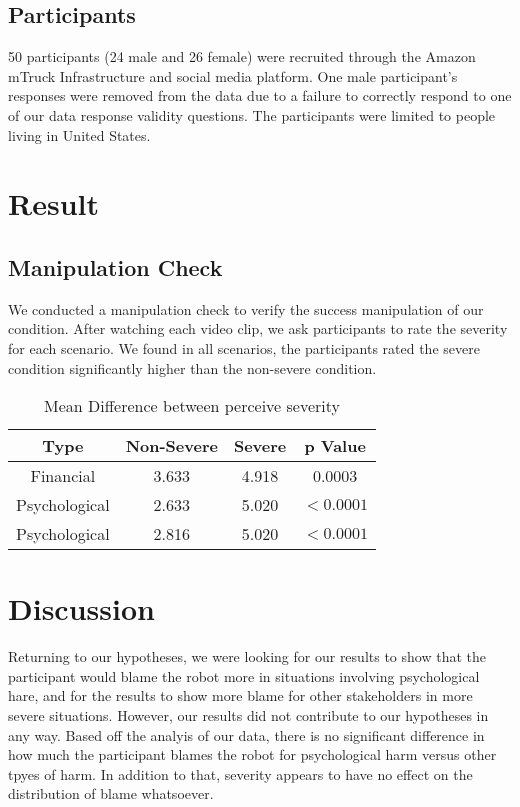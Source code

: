 \documentclass{sigchi}
\begin{document}
\subsection{Participants}
50 participants (24 male and 26 female) were recruited through the Amazon mTruck Infrastructure and social media platform. One male participant's responses were removed from the data due to a failure to correctly respond to one of our data response validity questions. The participants were limited to people living in  United States.

\section{Result}
\subsection{Manipulation Check}
We conducted a manipulation check to verify the success manipulation of our condition. After watching each video clip, we ask participants to rate the severity for each scenario. We found in all scenarios, the participants rated the severe condition significantly higher than the non-severe condition.

\begin{table}
  \centering
  \begin{tabular}{|c|c|c|c|}
    \hline
    Type & Non-Severe & Severe & p Value \\
    \hline
    Financial & 3.633 & 4.918 & 0.0003 \\
    \hline
    Psychological & 2.633 & 5.020 & $ < 0.0001$ \\
    \hline
    Psychological & 2.816 & 5.020 & $ < 0.0001$ \\
    \hline
  \end{tabular}
  \caption{Mean Difference between perceive severity}
  \label{tab:table1}
\end{table}

\section{Discussion}
Returning to our hypotheses, we were looking for our results to show that the participant would blame the robot more in situations involving psychological hare, and for the results to show more blame for other stakeholders in more severe situations. However, our results did not contribute to our hypotheses in any way. Based off the analyis of our data, there is no significant difference in how much the participant blames the robot for psychological harm versus other tpyes of harm. In addition to that, severity appears to have no effect on the distribution of blame whatsoever.
\end{document}
